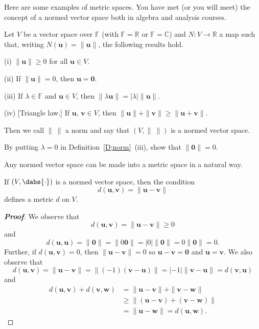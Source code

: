 Here are some examples of metric spaces. You have met (or you will meet) the concept of a normed vector space both in algebra and analysis courses.
\begin{definition}\label{D;norm} 
Let $V$ be a vector space over ${\mathbb F}$
(with ${\mathbb F}={\mathbb R}$ or 
${\mathbb F}={\mathbb C}$) and $N:V\rightarrow{\mathbb R}$ a map such that,
writing $N({\mathbf u})=\|{\mathbf u}\|$, the following results
hold.

(i) $\|{\mathbf u}\|\geq 0$ for all ${\mathbf u}\in V$.

(ii) If  $\|{\mathbf u}\|=0$, then ${\mathbf u}={\boldsymbol 0}$.

(iii) If $\lambda\in{\mathbb F}$ and ${\mathbf u}\in V$,
then $\|\lambda{\mathbf u}\|=|\lambda| \|{\mathbf u}\|$.

(iv) [Triangle law.]
If ${\mathbf u},\,{\mathbf v}\in V$, then 
$\|{\mathbf u}\|+\|{\mathbf v}\|\geq \|{\mathbf u}+{\mathbf v}\|$.

\noindent Then we call $\|\ \|$ a norm and say that
$(V,\|\ \|)$ is a normed vector space.
\end{definition}

\begin{exercise} By putting $\lambda=0$ in Definition~\ref{D;norm}~(iii),
show that $\|{\boldsymbol 0}\|=0$.
\end{exercise}
Any normed vector space can be made into a metric space in a natural way.

\begin{theorem}\label{P;norm to metric} 
If $(V,\dabs{\cdot})$ is a normed vector space,
then the condition 
\[d({\mathbf u},{\mathbf v})=\|{\mathbf u}-{\mathbf v}\|\]
defines a metric $d$ on $V$.
\end{theorem}
\begin{proof}[\bf Proof] We observe that
\[d({\mathbf u},{\mathbf v})=\|{\mathbf u}-{\mathbf v}\|\geq 0\]
and 
\[d({\mathbf u},{\mathbf u})=\|{\boldsymbol 0}\|=
\|0{\boldsymbol 0}\|=|0|\|{\boldsymbol 0}\|
=0\|{\boldsymbol 0}\|=0.\]
Further, if $d({\mathbf u},{\mathbf v})=0$, 
then $\|{\mathbf u}-{\mathbf v}\|=0$
so ${\mathbf u}-{\mathbf v}={\boldsymbol 0}$ and ${\mathbf u}={\mathbf v}$.
We also observe that
\[d({\mathbf u},{\mathbf v})=\|{\mathbf u}-{\mathbf v}\|=
\|(-1)({\mathbf v}-{\mathbf u})\|
=|-1|\|{\mathbf v}-{\mathbf u}\|=d({\mathbf v},{\mathbf u})\]
and
\begin{align*}
d({\mathbf u},{\mathbf v})+d({\mathbf v},{\mathbf w})&=
\|{\mathbf u}-{\mathbf v}\|+\|{\mathbf v}-{\mathbf w}\|\\
&\geq \|({\mathbf u}-{\mathbf v})+({\mathbf v}-{\mathbf w})\|\\
&=\|{\mathbf u}-{\mathbf w}\|=
d({\mathbf u},{\mathbf w}).
\end{align*}
\end{proof}


